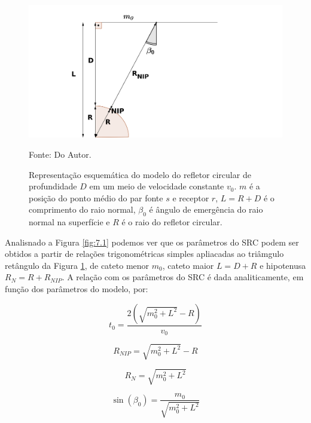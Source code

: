 \begin{figure}[htb]
\caption{Representação esquemática do modelo do refletor circular de profundidade $D$
em um meio de velocidade constante $v_0$.
$m$ é a posição do ponto médio do par fonte $s$ e receptor $r$, $L=R+D$ é o comprimento do raio normal, 
$\beta_0$ é ângulo de emergência
do raio normal na superfície e $R$ é o raio do refletor circular.}
\begin{flushleft}
\includegraphics[scale=0.45]{images/circ_mod.png}
\vspace{-0.3cm}
\end{flushleft}
\begin{center}
 Fonte: Do Autor.
\end{center}
\label{fig:7.3}
\end{figure}

Analisnado a Figura \ref{fig:7.1} podemos ver que os parâmetros do SRC podem ser obtidos a partir
de relações trigonométricas simples apliacadas ao triâmgulo retângulo da Figura \ref{fig:7.3}, de cateto menor
$m_0$, cateto maior $L=D+R$ e hipotenusa $R_N=R+R_{NIP}$.
A relação com os parâmetros do SRC é dada analiticamente, em função dos parâmetros do modelo, por:

\begin{equation}
\label{eq:7.4}
t_0=\frac{2(\sqrt{m_0^2+L^2}-R)}{v_0}
\end{equation}

\begin{equation}
\label{eq:7.5}
R_{NIP}=\sqrt{m_0^2+L^2}-R
\end{equation}

\begin{equation}
\label{eq:7.6}
R_N =\sqrt{m_0^2+L^2}
\end{equation}

\begin{equation}
\label{eq:7.7}
\sin(\beta_0)=\frac{m_0}{\sqrt{m_0^2+L^2}}
\end{equation}


